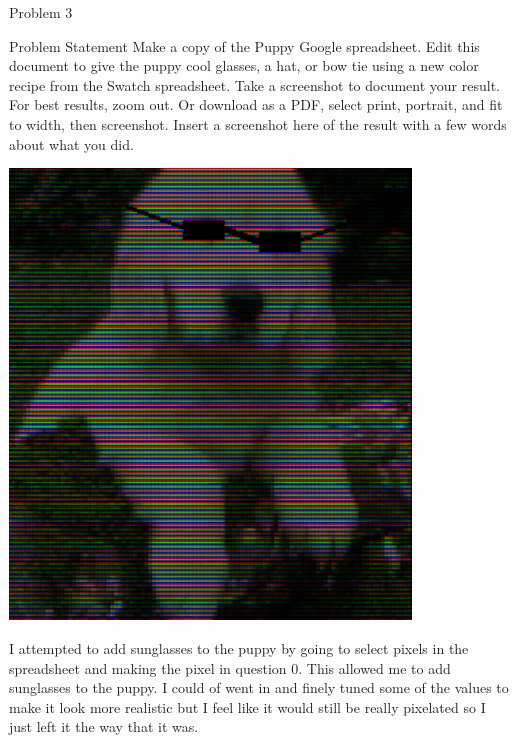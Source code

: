 \begin{problem}{Problem 3}
    \begin{statement}{Problem Statement}
        Make a copy of the Puppy Google spreadsheet. Edit this document to give the puppy cool glasses, a hat, or bow tie using a new color recipe from the Swatch spreadsheet. Take a screenshot to 
        document your result. For best results, zoom out. Or download as a PDF, select print, portrait, and fit to width, then screenshot. Insert a screenshot here of the result with a few words about 
        what you did.
    \end{statement}

    \begin{highlight}[Solution]
        \begin{center}
            \includegraphics[width = 0.8\textwidth]{Images/Puppy.png}
        \end{center}
        I attempted to add sunglasses to the puppy by going to select pixels in the spreadsheet and making the pixel in question 0. This allowed me to add sunglasses to the puppy. I could of went in and
        finely tuned some of the values to make it look more realistic but I feel like it would still be really pixelated so I just left it the way that it was.
    \end{highlight}
\end{problem}

